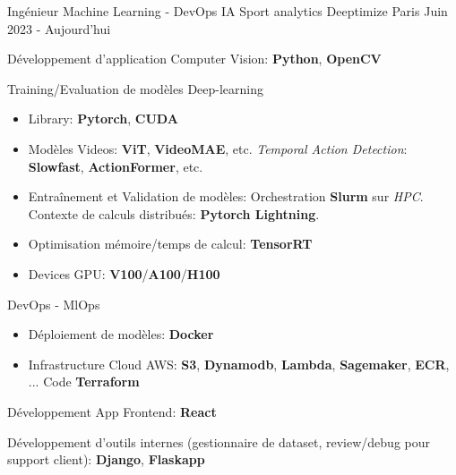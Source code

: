 

\begin{cventries}

	\cventry
	{Ingénieur Machine Learning - DevOps}
	{IA Sport analytics}
	{Deeptimize} %
	{Paris} %
	{Juin 2023 - Aujourd'hui} %
	{
		\begin{cvitems}
			\item{Développement d'application Computer Vision: \textbf{Python}, \textbf{OpenCV}}
			\item{Training\slash Evaluation de modèles Deep-learning}
			\begin{itemize}
				\item{Library: \textbf{Pytorch}, \textbf{CUDA}}
				\item{Modèles Videos: \textbf{ViT}, \textbf{VideoMAE}, etc. \textit{Temporal Action Detection}: \textbf{Slowfast}, \textbf{ActionFormer}, etc.}
				\item{Entraînement et Validation de modèles: Orchestration \textbf{Slurm} sur \textit{HPC}. Contexte de calculs distribués: \textbf{Pytorch Lightning}.}
				\item{Optimisation mémoire\slash temps de calcul: \textbf{TensorRT}}
				\item{Devices GPU: \textbf{V100}\slash \textbf{A100}\slash \textbf{H100}}
			\end{itemize}
			\item{DevOps - MlOps}
			\begin{itemize}
				\item{Déploiement de modèles: \textbf{Docker}}
				\item{Infrastructure Cloud AWS: \textbf{S3}, \textbf{Dynamodb}, \textbf{Lambda}, \textbf{Sagemaker}, \textbf{ECR}, ... Code \textbf{Terraform}}
			\end{itemize}
			\item{Développement App Frontend: \textbf{React}}
			\item{Développement d'outils internes (gestionnaire de dataset, review\slash debug pour support client)}: \textbf{Django}, \textbf{Flaskapp}
		\end{cvitems}
	}


\end{cventries}
